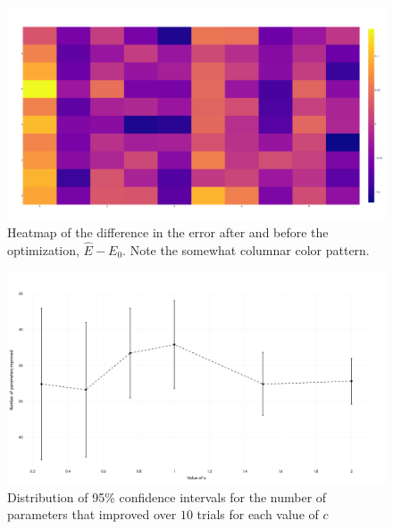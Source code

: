 \documentclass[12pt]{article}
\theoremstyle{definition}
\begin{document}
\begin{figure}[hbt!]
    \par
    \begin{center}
    \caption{Heatmap of the difference in the error after and before the optimization, $\hat{E} - E_0$. Note the somewhat columnar color pattern.}
    \label{fig:heatmapImprovements}
    \includegraphics[scale=0.10]{Figures/heatmap_improved_params.png}
    \end{center}
    \par
    \vspace{-0.25in}
    \medskip
\end{figure}

\vspace{-0.5in}

\begin{figure}[hbt!]
    \par
    \begin{center}
    \caption{Distribution of 95\% confidence intervals for the number of parameters that improved over $10$ trials for each value of $c$}
    \label{fig:errorBarNumImproved}
    \includegraphics[scale=0.10]{Figures/error_bars_num_params_improved.png}
    \end{center}
    \par
    \vspace{-0.25in}
    \medskip
\end{figure}
\end{document}
